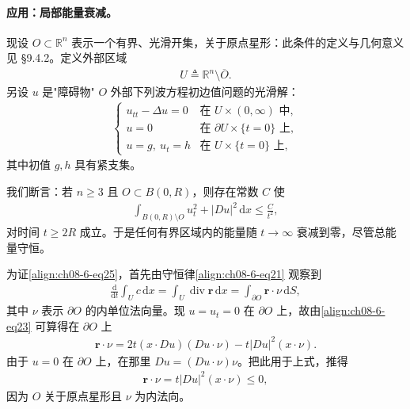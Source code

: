 \documentclass[../../main.tex]{subfiles}
\begin{document}
\paragraph{应用：局部能量衰减。}现设 $O\subset\mathbb{R}^n$ 表示一个有界、光滑开集，关于原点星形：此条件的定义与几何意义见 \S9.4.2。定义外部区域
\begin{align*}
U\triangleq\mathbb{R}^n\setminus\overline{O}.
\end{align*}
另设 $u$ 是"障碍物" $O$ 外部下列波方程初边值问题的光滑解：
\begin{align*}
\begin{cases}
u_{tt}-\Delta u=0&\text{在 }U\times(0,\infty)\text{ 中},\\
u=0&\text{在 }\partial U\times\{t=0\}\text{ 上},\\
u=g,\ u_t=h&\text{在 }U\times\{t=0\}\text{ 上},
\end{cases}
\end{align*}
其中初值 $g,h$ 具有紧支集。

我们断言：若 $n\geqslant 3$ 且 $O\subset B(0,R)$，则存在常数 $C$ 使
\begin{align}
\int_{B(0,R)\setminus O}u_t^2+|Du|^2\,\mathrm{d}x\leqslant\frac{C}{t^2},\label{align:ch08-6-eq25}
\end{align}
对时间 $t\geqslant 2R$ 成立。于是任何有界区域内的能量随 $t\to\infty$ 衰减到零，尽管总能量守恒。

为证\eqref{align:ch08-6-eq25}，首先由守恒律\eqref{align:ch08-6-eq21} 观察到
\begin{align}
\frac{\mathrm{d}}{\mathrm{d}t}\int_U c\,\mathrm{d}x=\int_U\operatorname{div}\mathbf{r}\,\mathrm{d}x=\int_{\partial O}\mathbf{r}\cdot\nu\,\mathrm{d}S,\label{align:ch08-6-eq26}
\end{align}
其中 $\nu$ 表示 $\partial O$ 的内单位法向量。现 $u=u_t=0$ 在 $\partial O$ 上，故由\eqref{align:ch08-6-eq23} 可算得在 $\partial O$ 上
\begin{align*}
\mathbf{r}\cdot\nu=2t(x\cdot Du)(Du\cdot\nu)-t|Du|^2(x\cdot\nu).
\end{align*}
由于 $u=0$ 在 $\partial O$ 上，在那里 $Du=(Du\cdot\nu)\nu$。把此用于上式，推得
\begin{align*}
\mathbf{r}\cdot\nu=t|Du|^2(x\cdot\nu)\leqslant 0,
\end{align*}
因为 $O$ 关于原点星形且 $\nu$ 为内法向。
\end{document}

